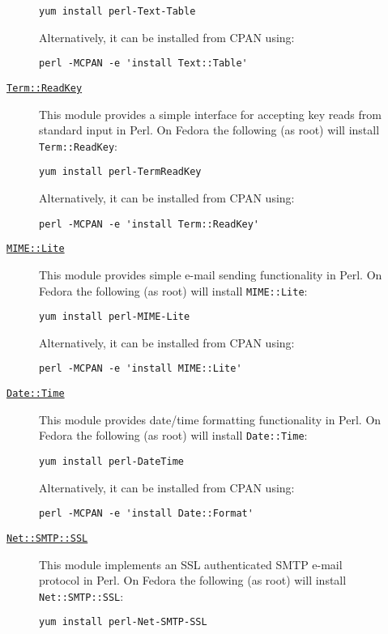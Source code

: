 \begin{description}
\begin{description}
\begin{verbatim}
yum install perl-Text-Table
\end{verbatim}
Alternatively, it can be installed from CPAN using:
\begin{verbatim}
perl -MCPAN -e 'install Text::Table'
\end{verbatim}
  \item [\href{http://search.cpan.org/dist/TermReadKey/ReadKey.pm}{{\tt Term::ReadKey}}] This module provides a simple interface for accepting key reads from standard input in Perl. On Fedora the following (as root) will install {\tt Term::ReadKey}:
\begin{verbatim}
yum install perl-TermReadKey
\end{verbatim}
Alternatively, it can be installed from CPAN using:
\begin{verbatim}
perl -MCPAN -e 'install Term::ReadKey'
\end{verbatim}
  \item [\href{http://search.cpan.org/~rjbs/MIME-Lite-3.027/lib/MIME/Lite.pm}{{\tt MIME::Lite}}] This module provides simple e-mail sending functionality in Perl. On Fedora the following (as root) will install {\tt MIME::Lite}:
\begin{verbatim}
yum install perl-MIME-Lite
\end{verbatim}
Alternatively, it can be installed from CPAN using:
\begin{verbatim}
perl -MCPAN -e 'install MIME::Lite'
\end{verbatim}
  \item [\href{http://search.cpan.org/~gbarr/TimeDate-1.20/lib/Date/Format.pm}{{\tt Date::Time}}] This module provides date/time formatting functionality in Perl. On Fedora the following (as root) will install {\tt Date::Time}:
\begin{verbatim}
yum install perl-DateTime
\end{verbatim}
Alternatively, it can be installed from CPAN using:
\begin{verbatim}
perl -MCPAN -e 'install Date::Format'
\end{verbatim}
  \item [\href{http://search.cpan.org/~cwest/Net-SMTP-SSL-1.01/lib/Net/SMTP/SSL.pm}{{\tt Net::SMTP::SSL}}] This module implements an SSL authenticated SMTP e-mail protocol in Perl. On Fedora the following (as root) will install {\tt Net::SMTP::SSL}:
\begin{verbatim}
yum install perl-Net-SMTP-SSL
\end{verbatim}

\end{description}
\end{description}
